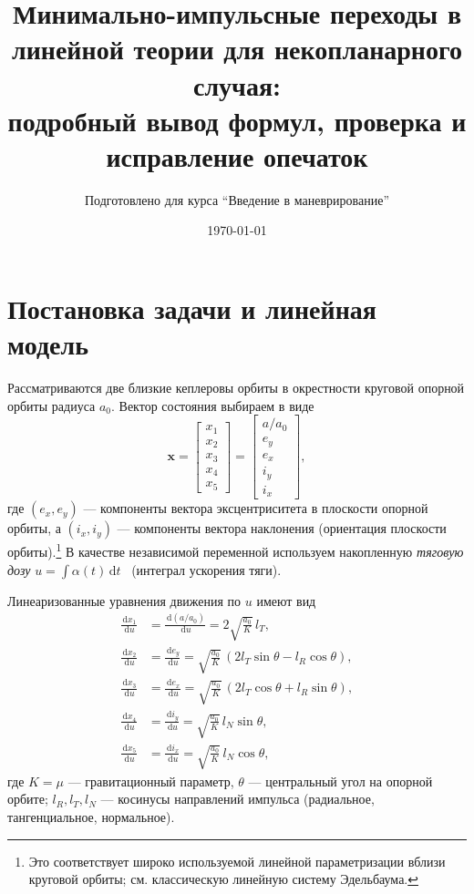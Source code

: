 \documentclass[12pt,a4paper]{article}
\title{Минимально-импульсные переходы в линейной теории для некопланарного случая:\\
подробный вывод формул, проверка и исправление опечаток}
\author{Подготовлено для курса ``Введение в маневрирование''}
\date{\today}
\newcommand{\dd}{\,\mathrm{d}}
\newcommand{\vv}[1]{\bm{#1}}
\begin{document}
\maketitle
\tableofcontents

\section{Постановка задачи и линейная модель}
Рассматриваются две близкие кеплеровы орбиты в окрестности круговой опорной орбиты радиуса $a_0$.
Вектор состояния выбираем в виде
\[
\vv x = \begin{bmatrix}
x_1\\x_2\\x_3\\x_4\\x_5
\end{bmatrix}
=
\begin{bmatrix}
a/a_0 \\ e_y \\ e_x \\ i_y \\ i_x
\end{bmatrix},
\]
где $(e_x,e_y)$ --- компоненты вектора эксцентриситета в плоскости опорной орбиты,
а $(i_x,i_y)$ --- компоненты вектора наклонения (ориентация плоскости орбиты).\footnote{Это соответствует широко используемой линейной параметризации вблизи круговой орбиты; см. классическую линейную систему Эдельбаума.}
В качестве независимой переменной используем накопленную \emph{тяговую дозу} $u=\int \!\alpha(t)\dd t$ \ (интеграл ускорения тяги).

Линеаризованные уравнения движения по $u$ имеют вид
\begin{align}
\frac{\dd x_1}{\dd u} &= \frac{\dd (a/a_0)}{\dd u}= 2\sqrt{\frac{a_0}{K}}\, l_T, \label{eq:eom1}\\
\frac{\dd x_2}{\dd u} &= \frac{\dd e_y}{\dd u}= \sqrt{\frac{a_0}{K}}\,(2l_T\sin\theta - l_R\cos\theta), \label{eq:eom2}\\
\frac{\dd x_3}{\dd u} &= \frac{\dd e_x}{\dd u}= \sqrt{\frac{a_0}{K}}\,(2l_T\cos\theta + l_R\sin\theta), \label{eq:eom3}\\
\frac{\dd x_4}{\dd u} &= \frac{\dd i_y}{\dd u}= \sqrt{\frac{a_0}{K}}\, l_N\sin\theta, \label{eq:eom4}\\
\frac{\dd x_5}{\dd u} &= \frac{\dd i_x}{\dd u}= \sqrt{\frac{a_0}{K}}\, l_N\cos\theta, \label{eq:eom5}
\end{align}
где $K=\mu$ --- гравитационный параметр, $\theta$ --- центральный угол на опорной орбите; $l_R,l_T,l_N$ --- косинусы направлений импульса (радиальное, тангенциальное, нормальное).
\end{document}
